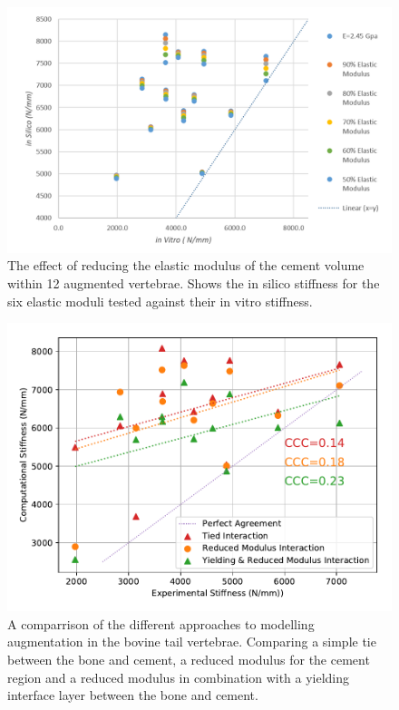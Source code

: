 \begin{figure}[ht!]
\centering
\includegraphics[width=5.3in]{images/reductionOfEMod_Scatter.png}
\caption{The effect of reducing the elastic modulus of the cement volume within 12 augmented vertebrae. Shows the in silico stiffness for the six elastic moduli tested against their in vitro stiffness. }
\label{fig:redEModscatter}
\end{figure}

\begin{figure}[ht!]
\centering
\includegraphics[width=5.3in]{images/exp_50_yield_tied.pdf}
	\caption[A comparrison of the different approaches to modelling augmentation in the bovine tail vertebrae.]{A comparrison of the different approaches to modelling augmentation in the bovine tail vertebrae. Comparing a simple tie between the bone and cement, a reduced modulus for the cement region and a reduced modulus in combination with a yielding interface layer between the bone and cement.}
	\label{fig:exp_50_yield_tied}
\end{figure}

